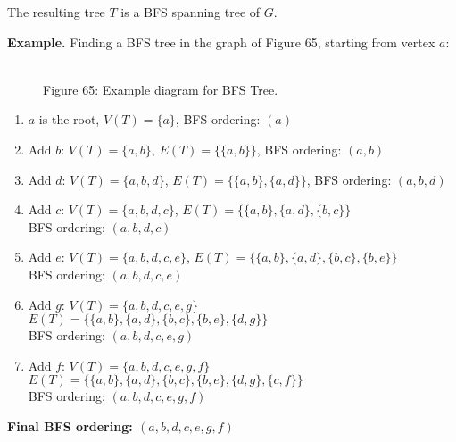 \documentclass{article}
\theoremstyle{definition}
\begin{document}
The resulting tree $T$ is a BFS spanning tree of $G$.

\noindent\textbf{Example.}
Finding a BFS tree in the graph of Figure 65, starting from vertex $a$:
\begin{figure}[h]
\centering
{}
\\
\small
Figure 65: Example diagram for BFS Tree. 
\label{fig:graph-example1}
\end{figure}

\begin{enumerate}
\item $a$ is the root, $V(T) = \{a\}$, BFS ordering: $(a)$
\item Add $b$: $V(T) = \{a, b\}$, $E(T) = \{\{a, b\}\}$, BFS ordering: $(a, b)$
\item Add $d$: $V(T) = \{a, b, d\}$, $E(T) = \{\{a, b\}, \{a, d\}\}$, BFS ordering: $(a, b, d)$
\item Add $c$: $V(T) = \{a, b, d, c\}$, $E(T) = \{\{a, b\}, \{a, d\}, \{b, c\}\}$\\
   BFS ordering: $(a, b, d, c)$
\item Add $e$: $V(T) = \{a, b, d, c, e\}$, $E(T) = \{\{a, b\}, \{a, d\}, \{b, c\}, \{b, e\}\}$\\
   BFS ordering: $(a, b, d, c, e)$
\item Add $g$: $V(T) = \{a, b, d, c, e, g\}$\\
   $E(T) = \{\{a, b\}, \{a, d\}, \{b, c\}, \{b, e\}, \{d, g\}\}$\\
   BFS ordering: $(a, b, d, c, e, g)$
\item Add $f$: $V(T) = \{a, b, d, c, e, g, f\}$\\
   $E(T) = \{\{a, b\}, \{a, d\}, \{b, c\}, \{b, e\}, \{d, g\}, \{c, f\}\}$\\
   BFS ordering: $(a, b, d, c, e, g, f)$
\end{enumerate}
\textbf {Final BFS ordering: $(a, b, d, c, e, g, f)$}
\end{document}
